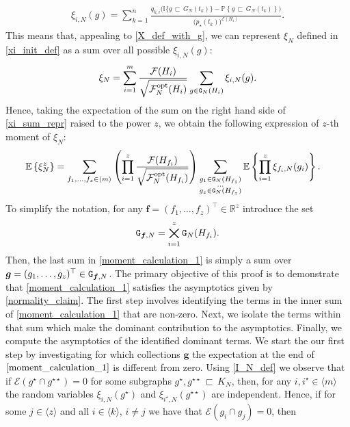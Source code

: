 \documentclass[11pt,reqno]{amsart}
\numberwithin{equation}{section}
\newcommand{\sprod}[1]{\langle#1\rangle}
\newcommand{\E}[1]{\mathbb{E}\left\{ #1\right\}}
\newcommand{\pk}[1]{\mathbb{P} \left\{ #1 \right \} }
\newcommand{\R}{\mathbb{R}}
\newcommand{\kb}[1]{\boldsymbol{#1}}
\newcommand{\vk}[1]{\kb{#1}}
\begin{document}
\begin{align}
    \xi_{i,{N}}(g) = \sum_{k=1}^{n}\frac{q_{k,i}\bigl(\mathbb{I}\{g{\,\sqsubset\,} G_N(t_k)\} - \pk{g{\,\sqsubset\,} G_N(t_k)}\bigr)}{\bigl(p_{\star}(t_k)\bigr)^{\mathcal{E}({H}_i)}}.\label{xi_def}
\end{align} 
This means that, appealing to \eqref{X_def_with_g}, we can represent $\xi_{{N}}$ defined in \eqref{xi_init_def} as a sum over all possible $\xi_{i,{N}}(g)$:  
\begin{align}
    \xi_{{N}} = \sum\limits_{i=1}^{m}\frac{\mathcal{F}({H}_i)}{\sqrt{\mathcal{F}^{\rm opt}_N({H}_i)}}\sum\limits_{g\in{\tt G}_N({H}_i)}\xi_{i,{N}}(g).\label{xi_sum_repr}
\end{align}
Hence, taking the expectation of the sum on the right hand side of \eqref{xi_sum_repr} raised to the power $z$, we obtain the following  expression of $z$-th moment of $\xi_{{N}}$: 
\begin{align}
    \E{\xi_{{N}}^z} &= \sum_{f_1,\ldots,f_{z}\in\sprod{m}}\left(\prod\limits_{i=1}^{z}\frac{\mathcal{F}({H}_{f_i})}{\sqrt{\mathcal{F}^{\rm opt}_N({H}_{f_i})}}\right)\sum_{\substack{g_1\in{\tt G}_N({H}_{f_1}) \\ \ldots \\ g_{z}\in{\tt G}_N({H}_{f_z})}}\E{\prod_{i=1}^{z}\xi_{f_i,{N}}(g_i)}.\label{moment_calculation_1}
\end{align}
To simplify the notation, {for any $\vk f = (f_{1},\ldots,f_z)^{\top}\in\R^z$} introduce the set
\begin{align*}
    {\tt G}_{\vk f,N} = \bigtimes\limits_{i=1}^{z}{\tt G}_{N}({H}_{f_i}).
\end{align*}
Then, the last sum in \eqref{moment_calculation_1} is simply a sum over ${\vk g = (g_1,\ldots,g_z)^{\top}\in{\tt G}_{\vk f,N}}$. {The primary objective of this proof is to demonstrate that \eqref{moment_calculation_1} satisfies the asymptotics given by \eqref{normality_claim}. The first step involves identifying the terms in the inner sum of \eqref{moment_calculation_1} that are non-zero. Next, we isolate the terms within that sum which make the dominant contribution to the asymptotics. Finally, we compute the asymptotics of the identified dominant terms.} We start the {our first step} by investigating for which collections $\vk g$ the expectation at the end of $\eqref{moment_calculation_1}$ is different from zero. Using \eqref{I_N_def} we observe that if $\mathcal{E}(g^{\star}\cap g^{\star\star}) = 0$ for some subgraphs $g^{\star},g^{\star\star}{\,\sqsubset\,} K_N$, then, for any $i,i^{\star}\in\sprod{m}$ the random variables $\xi_{i,{N}}(g^{\star})$ and $\xi_{i^{\star},{N}}(g^{\star\star})$ are independent. Hence, if for some $j\in\sprod{z}$ and all $i\in\sprod{k}$, $i\not= j$ we have that $\mathcal{E}(g_{i}\cap g_{j}) = 0$, then
\end{document}
